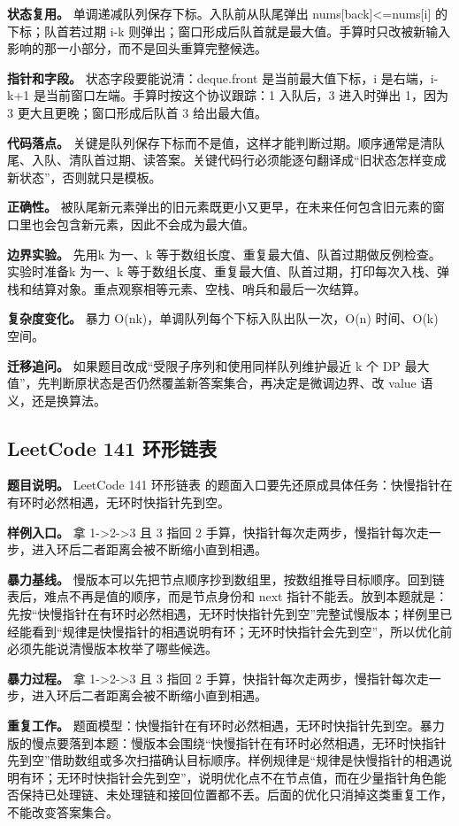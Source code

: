 \textbf{状态复用。} 单调递减队列保存下标。入队前从队尾弹出 nums[back]<=nums[i] 的下标；队首若过期 i-k 则弹出；窗口形成后队首就是最大值。手算时只改被新输入影响的那一小部分，而不是回头重算完整候选。

\textbf{指针和字段。} 状态字段要能说清：deque.front 是当前最大值下标，i 是右端，i-k+1 是当前窗口左端。手算时按这个协议跟踪：1 入队后，3 进入时弹出 1，因为 3 更大且更晚；窗口形成后队首 3 给出最大值。

\textbf{代码落点。} 关键是队列保存下标而不是值，这样才能判断过期。顺序通常是清队尾、入队、清队首过期、读答案。关键代码行必须能逐句翻译成“旧状态怎样变成新状态”，否则就只是模板。

\textbf{正确性。} 被队尾新元素弹出的旧元素既更小又更早，在未来任何包含旧元素的窗口里也会包含新元素，因此不会成为最大值。

\textbf{边界实验。} 先用k 为一、k 等于数组长度、重复最大值、队首过期做反例检查。实验时准备k 为一、k 等于数组长度、重复最大值、队首过期，打印每次入栈、弹栈和结算对象。重点观察相等元素、空栈、哨兵和最后一次结算。

\textbf{复杂度变化。} 暴力 O(nk)，单调队列每个下标入队出队一次，O(n) 时间、O(k) 空间。

\textbf{迁移追问。} 如果题目改成“受限子序列和使用同样队列维护最近 k 个 DP 最大值”，先判断原状态是否仍然覆盖新答案集合，再决定是微调边界、改 value 语义，还是换算法。

\subsection{LeetCode 141 环形链表}

\textbf{题目说明。} LeetCode 141 环形链表 的题面入口要先还原成具体任务：快慢指针在有环时必然相遇，无环时快指针先到空。

\textbf{样例入口。} 拿 1->2->3 且 3 指回 2 手算，快指针每次走两步，慢指针每次走一步，进入环后二者距离会被不断缩小直到相遇。

\textbf{暴力基线。} 慢版本可以先把节点顺序抄到数组里，按数组推导目标顺序。回到链表后，难点不再是值的顺序，而是节点身份和 next 指针不能丢。放到本题就是：先按“快慢指针在有环时必然相遇，无环时快指针先到空”完整试慢版本；样例里已经能看到“规律是快慢指针的相遇说明有环；无环时快指针会先到空”，所以优化前必须先能说清慢版本枚举了哪些候选。

\textbf{暴力过程。} 拿 1->2->3 且 3 指回 2 手算，快指针每次走两步，慢指针每次走一步，进入环后二者距离会被不断缩小直到相遇。

\textbf{重复工作。} 题面模型：快慢指针在有环时必然相遇，无环时快指针先到空。暴力版的慢点要落到本题：慢版本会围绕“快慢指针在有环时必然相遇，无环时快指针先到空”借助数组或多次扫描确认目标顺序。样例规律是“规律是快慢指针的相遇说明有环；无环时快指针会先到空”，说明优化点不在节点值，而在少量指针角色能否保持已处理链、未处理链和接回位置都不丢。后面的优化只消掉这类重复工作，不能改变答案集合。

